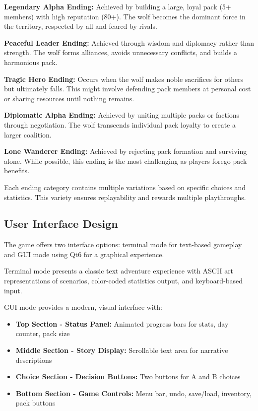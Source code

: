 \documentclass[12pt,a4paper]{article}
\begin{document}
\textbf{Legendary Alpha Ending:} Achieved by building a large, loyal pack (5+ members) with high reputation (80+). The wolf becomes the dominant force in the territory, respected by all and feared by rivals.

\textbf{Peaceful Leader Ending:} Achieved through wisdom and diplomacy rather than strength. The wolf forms alliances, avoids unnecessary conflicts, and builds a harmonious pack.

\textbf{Tragic Hero Ending:} Occurs when the wolf makes noble sacrifices for others but ultimately falls. This might involve defending pack members at personal cost or sharing resources until nothing remains.

\textbf{Diplomatic Alpha Ending:} Achieved by uniting multiple packs or factions through negotiation. The wolf transcends individual pack loyalty to create a larger coalition.

\textbf{Lone Wanderer Ending:} Achieved by rejecting pack formation and surviving alone. While possible, this ending is the most challenging as players forego pack benefits.

Each ending category contains multiple variations based on specific choices and statistics. This variety ensures replayability and rewards multiple playthroughs.

\subsection{User Interface Design}
The game offers two interface options: terminal mode for text-based gameplay and GUI mode using Qt6 for a graphical experience.

Terminal mode presents a classic text adventure experience with ASCII art representations of scenarios, color-coded statistics output, and keyboard-based input.

GUI mode provides a modern, visual interface with:
\begin{itemize}
	\item \textbf{Top Section - Status Panel:} Animated progress bars for stats, day counter, pack size
	\item \textbf{Middle Section - Story Display:} Scrollable text area for narrative descriptions
	\item \textbf{Choice Section - Decision Buttons:} Two buttons for A and B choices
	\item \textbf{Bottom Section - Game Controls:} Menu bar, undo, save/load, inventory, pack buttons
\end{itemize}
\end{document}
